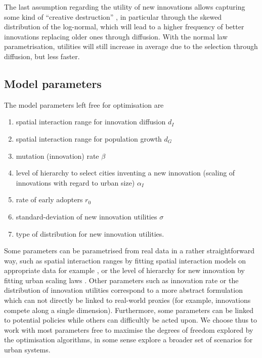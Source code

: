 \documentclass[final,5p,times,twocolumn,authoryear]{elsarticle}
\begin{document}
The last assumption regarding the utility of new innovations allows capturing some kind of ``creative destruction'' \citep{diamond2006schumpeter}, in particular through the skewed distribution of the log-normal, which will lead to a higher frequency of better innovations replacing older ones through diffusion. With the normal law parametrisation, utilities will still increase in average due to the selection through diffusion, but less faster.


\subsection{Model parameters}

The model parameters left free for optimisation are

\begin{enumerate}
    \item spatial interaction range for innovation diffusion $d_I$
    \item spatial interaction range for population growth $d_G$
    \item mutation (innovation) rate $\beta$
    \item level of hierarchy to select cities inventing a new innovation (scaling of innovations with regard to urban size) $\alpha_I$
    \item rate of early adopters $r_0$
    \item standard-deviation of new innovation utilities $\sigma$
    \item type of distribution for new innovation utilities.
\end{enumerate}

Some parameters can be parametrised from real data in a rather straightforward way, such as spatial interaction ranges by fitting spatial interaction models on appropriate data for example \citep{fotheringham1989spatial}, or the level of hierarchy for new innovation by fitting urban scaling laws \citep{pumain2006evolutionary}. Other parameters such as innovation rate or the distribution of innovation utilities correspond to a more abstract formulation which can not directly be linked to real-world proxies (for example, innovations compete along a single dimension). Furthermore, some parameters can be linked to potential policies while others can difficultly be acted upon. We choose thus to work with most parameters free to maximise the degrees of freedom explored by the optimisation algorithms, in some sense explore a broader set of scenarios for urban systems.
\end{document}
